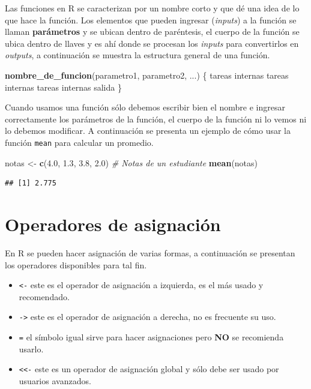 \documentclass[10pt,]{krantz}
\makeatletter
\newenvironment{Shaded}{\begin{snugshade}}{\end{snugshade}}
\newcommand{\KeywordTok}[1]{\textcolor[rgb]{0.13,0.29,0.53}{\textbf{{#1}}}}
\newcommand{\FloatTok}[1]{\textcolor[rgb]{0.00,0.00,0.81}{{#1}}}
\newcommand{\StringTok}[1]{\textcolor[rgb]{0.31,0.60,0.02}{{#1}}}
\newcommand{\CommentTok}[1]{\textcolor[rgb]{0.56,0.35,0.01}{\textit{{#1}}}}
\newcommand{\NormalTok}[1]{{#1}}
\providecommand{\tightlist}{%
  \setlength{\itemsep}{0pt}\setlength{\parskip}{0pt}}
\let\proglang=\textsf
\newenvironment{kframe}{%
\medskip{}
\setlength{\fboxsep}{.8em}
 \def\at@end@of@kframe{}%
 \ifinner\ifhmode%
  \def\at@end@of@kframe{\end{minipage}}%
  \begin{minipage}{\columnwidth}%
 \fi\fi%
 \def\FrameCommand##1{\hskip\@totalleftmargin \hskip-\fboxsep
 \colorbox{shadecolor}{##1}\hskip-\fboxsep
     \hskip-\linewidth \hskip-\@totalleftmargin \hskip\columnwidth}%
 \MakeFramed {\advance\hsize-\width
   \@totalleftmargin\z@ \linewidth\hsize
   \@setminipage}}%
 {\par\unskip\endMakeFramed%
 \at@end@of@kframe}
\renewenvironment{Shaded}{\begin{kframe}}{\end{kframe}}
\makeatother
\begin{document}
Las funciones en \proglang{R} se caracterizan por un nombre corto y que
dé una idea de lo que hace la función. Los elementos que pueden ingresar
(\emph{inputs}) a la función se llaman \textbf{parámetros} y se ubican
dentro de paréntesis, el cuerpo de la función se ubica dentro de llaves
y es ahí donde se procesan los \emph{inputs} para convertirlos en
\emph{outputs}, a continuación se muestra la estructura general de una
función.

\begin{Shaded}
\begin{Highlighting}[]
\KeywordTok{nombre_de_funcion}\NormalTok{(parametro1, parametro2, ...) \{}
  \NormalTok{tareas internas}
  \NormalTok{tareas internas}
  \NormalTok{tareas internas}
  \NormalTok{salida}
\NormalTok{\}}
\end{Highlighting}
\end{Shaded}

Cuando usamos una función sólo debemos escribir bien el nombre e
ingresar correctamente los parámetros de la función, el cuerpo de la
función ni lo vemos ni lo debemos modificar. A continuación se presenta
un ejemplo de cómo usar la función \texttt{mean} para calcular un
promedio.

\begin{Shaded}
\begin{Highlighting}[]
\NormalTok{notas <-}\StringTok{ }\KeywordTok{c}\NormalTok{(}\FloatTok{4.0}\NormalTok{, }\FloatTok{1.3}\NormalTok{, }\FloatTok{3.8}\NormalTok{, }\FloatTok{2.0}\NormalTok{)  }\CommentTok{# Notas de un estudiante}
\KeywordTok{mean}\NormalTok{(notas)}
\end{Highlighting}
\end{Shaded}

\begin{verbatim}
## [1] 2.775
\end{verbatim}

\section{\texorpdfstring{Operadores de asignación
}{Operadores de asignación }}\label{operadores-de-asignacion}

En \proglang{R} se pueden hacer asignación de varias formas, a
continuación se presentan los operadores disponibles para tal fin.

\begin{itemize}
\tightlist
\item
  \texttt{\textless{}-} este es el operador de asignación a izquierda,
  es el más usado y recomendado.
\item
  \texttt{-\textgreater{}} este es el operador de asignación a derecha,
  no es frecuente su uso.
\item
  \texttt{=} el símbolo igual sirve para hacer asignaciones pero
  \textbf{NO} se recomienda usarlo.
\item
  \texttt{\textless{}\textless{}-} este es un operador de asignación
  global y sólo debe ser usado por usuarios avanzados.
\end{itemize}
\end{document}
